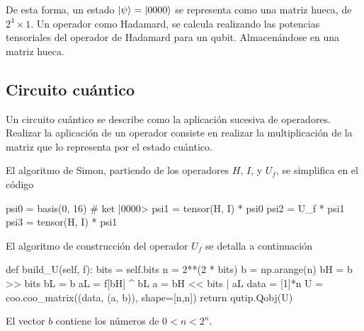 De esta forma, un estado $\ket{\psi} = \ket{0000} $ se representa como una 
matriz hueca, de $2^4 \times 1$. Un operador como Hadamard, se calcula 
realizando las potencias tensoriales del operador de Hadamard para un qubit.  
Almacenándose en una matriz hueca.

\subsection{Circuito cuántico}
Un circuito cuántico se describe como la aplicación sucesiva de operadores.  
Realizar la aplicación de un operador consiste en realizar la multiplicación de 
la matriz que lo representa por el estado cuántico.

El algoritmo de Simon, partiendo de los operadores $H$, $I$, y $U_f$, se 
simplifica en el código
%
\begin{pycode}
psi0 = basis(0, 16) # ket |0000>
psi1 = tensor(H, I) * psi0
psi2 = U_f * psi1
psi3 = tensor(H, I) * psi1
\end{pycode}
%
El algoritmo de construcción del operador $U_f$ se detalla a continuación
%
\begin{pycode}
def build_U(self, f):
	bits = self.bits
	n = 2**(2 * bits)
	b = np.arange(n)
	bH = b >> bits
	bL = b %
	aL = f[bH] ^ bL
	a = bH << bits | aL
	data = [1]*n
	U = coo.coo_matrix((data, (a, b)), shape=[n,n])
	return qutip.Qobj(U)
\end{pycode}
%
El vector $b$ contiene los números de $0 < n < 2^n$.
